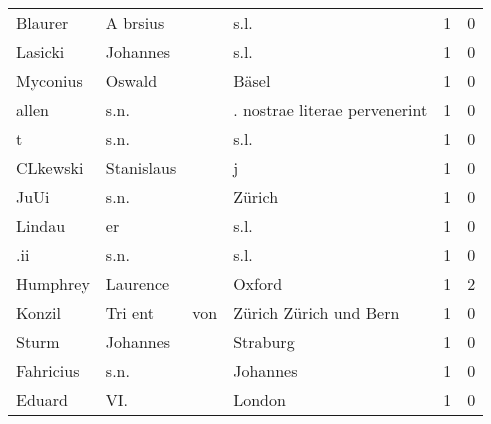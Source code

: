 \begin{tabular}{llllrr}
                  Blaurer &                           A brsius &             &                                        s.l. &          1 &         0 \\
                  Lasicki &                           Johannes &             &                                        s.l. &          1 &         0 \\
                 Myconius &                             Oswald &             &                                       Bäsel &          1 &         0 \\
                    allen &                               s.n. &             &               . nostrae literae pervenerint &          1 &         0 \\
                        t &                               s.n. &             &                                        s.l. &          1 &         0 \\
                 CLkewski &                         Stanislaus &             &                                           j &          1 &         0 \\
                     JuUi &                               s.n. &             &                                      Zürich &          1 &         0 \\
                   Lindau &                                 er &             &                                        s.l. &          1 &         0 \\
                      .ii &                               s.n. &             &                                        s.l. &          1 &         0 \\
                 Humphrey &                           Laurence &             &                                      Oxford &          1 &         2 \\
                   Konzil &                            Tri ent &         von &                      Zürich Zürich und Bern &          1 &         0 \\
                    Sturm &                           Johannes &             &                                    Straburg &          1 &         0 \\
                Fahricius &                               s.n. &             &                                    Johannes &          1 &         0 \\
                   Eduard &                                VI. &             &                                      London &          1 &         0 \\

\end{tabular}
